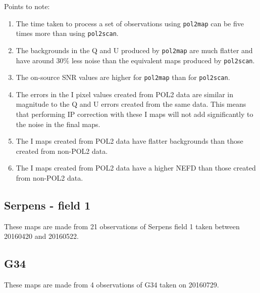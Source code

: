 \documentclass[twoside,11pt]{starlink}
\begin{document}
Points to note:
\begin{enumerate}
\item The time taken to process a set of observations using
\texttt{pol2map} can be five times more than using \texttt{pol2scan}.
\item The backgrounds in the Q and U produced by \texttt{pol2map} are much
flatter and have around $30\%$ less noise than the equivalent maps
produced by \texttt{pol2scan}.
\item The on-source SNR values are higher for \texttt{pol2map} than for
\texttt{pol2scan}.
\item The errors in the I pixel values created from POL2 data are similar
in magnitude to the Q and U errors created from the same data. This means
that performing IP correction with these I maps will not add
significantly  to the noise in the final maps.
\item The I maps created from POL2 data have flatter backgrounds than
those created from non-POL2 data.
\item The I maps created from POL2 data have a higher NEFD than those
created from non-POL2 data.
\end{enumerate}



\subsection{Serpens - field 1}
These maps are made from 21 observations of Serpens field 1 taken
between 20160420 and 20160522.










\subsection{G34}
These maps are made from 4 observations of G34 taken on 20160729.









\end{document}
